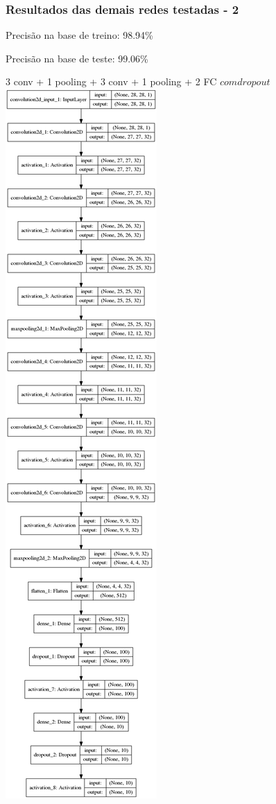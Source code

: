 \documentclass[tikz,11pt]{beamer}
\begin{document}
\begin{frame}
	\frametitle{Resultados das demais redes testadas - 2 }
	\centering
	\par Precisão na base de treino: 98.94\%
	\par Precisão na base de teste: 99.06\%
	\par 3 conv + 1 pooling + 3 conv + 1 pooling + 2 FC \(com dropout\)
	\\
	\includegraphics[height=.7\paperheight]{images/resultados/network_2/model}
\end{frame}
\end{document}
